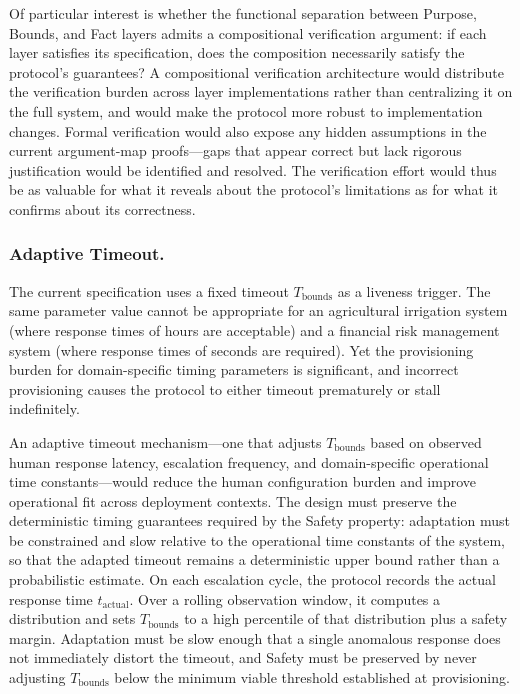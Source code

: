 Of particular interest is whether the functional separation between Purpose, Bounds, and Fact layers admits a compositional verification argument: if each layer satisfies its specification, does the composition necessarily satisfy the protocol's guarantees? A compositional verification architecture would distribute the verification burden across layer implementations rather than centralizing it on the full system, and would make the protocol more robust to implementation changes. Formal verification would also expose any hidden assumptions in the current argument-map proofs---gaps that appear correct but lack rigorous justification would be identified and resolved. The verification effort would thus be as valuable for what it reveals about the protocol's limitations as for what it confirms about its correctness.

\subsubsection{Adaptive Timeout.}

The current specification uses a fixed timeout $T_{\text{bounds}}$ as a liveness trigger. The same parameter value cannot be appropriate for an agricultural irrigation system (where response times of hours are acceptable) and a financial risk management system (where response times of seconds are required). Yet the provisioning burden for domain-specific timing parameters is significant, and incorrect provisioning causes the protocol to either timeout prematurely or stall indefinitely.

An adaptive timeout mechanism---one that adjusts $T_{\text{bounds}}$ based on observed human response latency, escalation frequency, and domain-specific operational time constants---would reduce the human configuration burden and improve operational fit across deployment contexts. The design must preserve the deterministic timing guarantees required by the Safety property: adaptation must be constrained and slow relative to the operational time constants of the system, so that the adapted timeout remains a deterministic upper bound rather than a probabilistic estimate. On each escalation cycle, the protocol records the actual response time $t_{\text{actual}}$. Over a rolling observation window, it computes a distribution and sets $T_{\text{bounds}}$ to a high percentile of that distribution plus a safety margin. Adaptation must be slow enough that a single anomalous response does not immediately distort the timeout, and Safety must be preserved by never adjusting $T_{\text{bounds}}$ below the minimum viable threshold established at provisioning.

